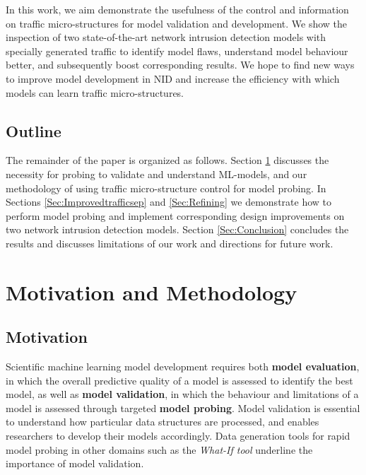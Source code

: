 \documentclass[conference]{IEEEtran}
\begin{document}
In this work, we aim demonstrate the usefulness of the control and information on traffic micro-structures for model validation and development. We show the inspection of two state-of-the-art network intrusion detection models with specially generated traffic to identify model flaws, understand model behaviour better, and subsequently boost corresponding results. We hope to find new ways to improve model development in NID and increase the efficiency with which models can learn traffic micro-structures.


\subsection{Outline}

The remainder of the paper is organized as follows. Section \ref{Sec:Motivation} discusses the necessity for probing to validate and understand ML-models, and our methodology of using traffic micro-structure control for model probing. In Sections \ref{Sec:Improvedtrafficsep} and \ref{Sec:Refining} we demonstrate how to perform model probing and implement corresponding design improvements on two network intrusion detection models. Section \ref{Sec:Conclusion} 
concludes the results and discusses limitations of our work and directions for future work.

\section{Motivation and Methodology}\label{Sec:Motivation}

\subsection{Motivation}

Scientific machine learning model development requires both \textbf{model evaluation}, in which the overall predictive quality of a model is assessed to identify the best model, as well as \textbf{model validation}, in which the behaviour and limitations of a model is assessed through targeted \textbf{model probing}. Model validation is essential to understand how particular data structures are processed, and enables researchers to develop their models accordingly. Data generation tools for rapid model probing in other domains such as the \textit{What-If tool} \cite{wexler2019if} underline the importance of model validation.
\end{document}
